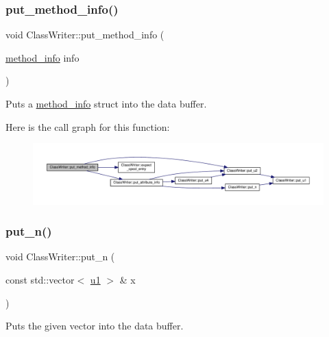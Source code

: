 \subsubsection{\texorpdfstring{put\+\_\+method\+\_\+info()}{put\_method\_info()}}
{\footnotesize\ttfamily void Class\+Writer\+::put\+\_\+method\+\_\+info (\begin{DoxyParamCaption}\item[{\hyperlink{structmethod__info}{method\+\_\+info}}]{info }\end{DoxyParamCaption})\hspace{0.3cm}{\ttfamily [private]}}



Puts a \hyperlink{structmethod__info}{method\+\_\+info} struct into the data buffer. 

Here is the call graph for this function\+:
\nopagebreak
\begin{figure}[H]
\begin{center}
\leavevmode
\includegraphics[width=350pt]{classClassWriter_a3221090999bef5f0e05993de89600670_cgraph}
\end{center}
\end{figure}
\mbox{\label{classClassWriter_aa527b917e9f3628ceaeccb95d30bfbb9}} 
\subsubsection{\texorpdfstring{put\+\_\+n()}{put\_n()}}
{\footnotesize\ttfamily void Class\+Writer\+::put\+\_\+n (\begin{DoxyParamCaption}\item[{const std\+::vector$<$ \hyperlink{types_8h_a162f47a77ee24f6f77cd8c82ccd40ab7}{u1} $>$ \&}]{x }\end{DoxyParamCaption})\hspace{0.3cm}{\ttfamily [private]}}



Puts the given vector into the data buffer. 

